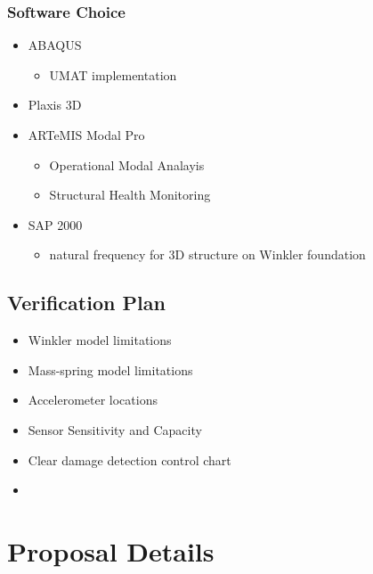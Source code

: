 \documentclass[
  letterpaper,
  DIV=11,
  numbers=noendperiod]{scrreprt}
\providecommand{\tightlist}{%
  \setlength{\itemsep}{0pt}\setlength{\parskip}{0pt}}\usepackage{longtable,booktabs,array}
\begin{document}
\hypertarget{software-choice}{%
\subsection{Software Choice}\label{software-choice}}

\begin{itemize}
\item
  ABAQUS

  \begin{itemize}
  \tightlist
  \item
    UMAT implementation
  \end{itemize}
\item
  Plaxis 3D
\item
  ARTeMIS Modal Pro

  \begin{itemize}
  \item
    Operational Modal Analayis
  \item
    Structural Health Monitoring
  \end{itemize}
\item
  SAP 2000

  \begin{itemize}
  \tightlist
  \item
    natural frequency for 3D structure on Winkler foundation
  \end{itemize}
\end{itemize}

\hypertarget{verification-plan}{%
\section{Verification Plan}\label{verification-plan}}

\begin{itemize}
\item
  Winkler model limitations
\item
  Mass-spring model limitations
\item
  Accelerometer locations
\item
  Sensor Sensitivity and Capacity
\item
  Clear damage detection control chart
\item
\end{itemize}

\hypertarget{proposal-details}{%
\chapter{Proposal Details}\label{proposal-details}}
\end{document}
